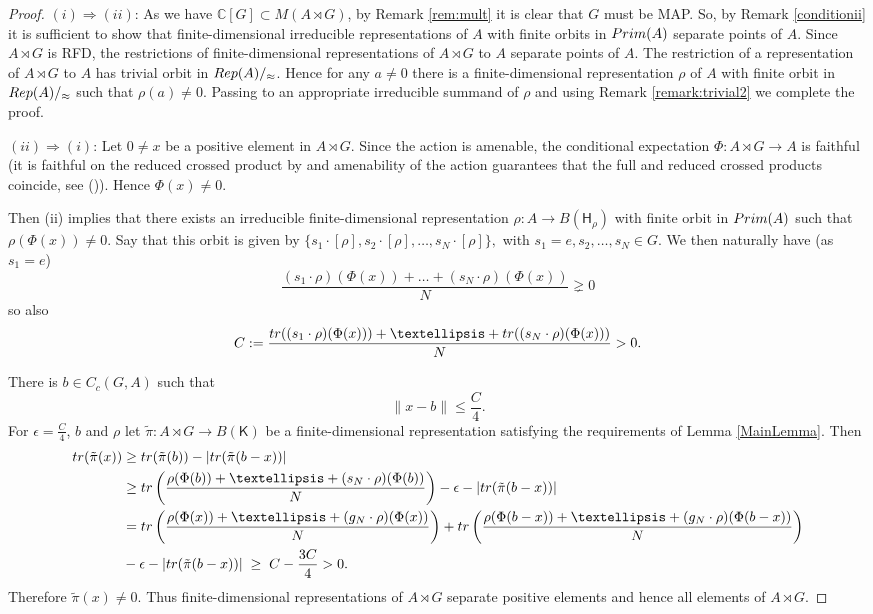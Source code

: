 \documentclass[11 pt, leqno, hidelinks]{amsart}%
\theoremstyle{plain}
\numberwithin{equation}{section}
\newcommand{\C}{\mathbb{C}}
\newcommand{\tr}{\textup{tr}}
\newcommand{\Rep}{\textup{Rep}}
\newcommand{\Prim}{\textup{Prim}}
\newcommand{\Hil}{\mathsf{H}}
\newcommand{\Kil}{\mathsf{K}}
\begin{document}
\begin{proof} $(i)\Rightarrow (ii)$:
		As we have $\C[G] \subset M(A\rtimes G)$, by Remark \ref{rem:mult} it is clear that $G$ must be MAP. So, by Remark \ref{conditionii} it is sufficient to show that finite-dimensional irreducible representations of $A$ with finite orbits in $\Prim(A)$ separate points of $A$. Since $A\rtimes G$ is RFD, the restrictions of finite-dimensional representations of $A\rtimes G$ to $A$ separate points of $A$. The restriction of a representation of $A\rtimes G$ to $A$ has trivial orbit in $\Rep(A)/_\approx$. Hence for any $a\neq 0$ there is a finite-dimensional representation $\rho$ of $A$ with finite orbit in $\Rep(A)/_\approx$ such that $\rho(a)\neq 0$.  Passing to an appropriate irreducible summand of $\rho$ and using Remark \ref{remark:trivial2} we complete the proof.



	
	
	
	\medskip
	


	
	$(ii)\Rightarrow (i)$:
	Let $0\neq x$ be a positive element in $A\rtimes G$. Since the action is amenable, the conditional expectation $\Phi: A\rtimes G \to A$ is faithful (it is faithful on the reduced crossed product by \cite[Proposition 4.1.9]{BO} and amenability of the action guarantees that the full and reduced crossed products coincide, see (\cite[Proposition 4.8]{Claire})). Hence $\Phi(x)\neq 0$. 	

Then (ii) implies that there exists an irreducible  finite-dimensional representation $\rho: A \to B(\Hil_\rho)$ with finite orbit in $\Prim(A)$ such that   $\rho(\Phi(x))\neq 0$.
	 Say that this orbit is given by $\{s_1\cdot [\rho], s_2\cdot[\rho], \ldots, s_N\cdot[\rho]\},$ with $s_1=e, s_2, \ldots, s_N \in G$.  We then naturally have (as $s_1=e$)
	\[ \frac{(s_1 \cdot\rho)(\Phi(x))+\ldots + (s_N \cdot\rho)(\Phi(x))}{N}\gneq 0\]
	so also
	\[ C: = \frac{\tr ((s_1 \cdot\rho)(\Phi(x)))+\ldots + \tr((s_N \cdot\rho)(\Phi(x)))}{N}>0.\]
	
	
	There is $b\in C_c(G, A)$ such that $$\|x-b\|\le \frac{C}{4}.$$ For $\epsilon = \frac{C}{4}$, $b$ and $ \rho$ let  $\tilde\pi: A \rtimes G \to B(\Kil)$ be a finite-dimensional representation satisfying the requirements of Lemma \ref{MainLemma}. Then
	\begin{align*} \tr (\tilde\pi(x))& \ge \tr (\tilde\pi(b)) - |\tr (\tilde\pi(b-x))|
		\\&  \ge \tr \left(\frac{ \rho(\Phi(b))+\ldots + (s_N \cdot\rho)(\Phi(b))}{N} \right)  - \epsilon - |\tr (\tilde\pi(b-x))| \\ &=\tr \left(\frac{ \rho(\Phi(x))+\ldots + (g_N\cdot\rho)(\Phi(x))}{N} \right)  + \tr \left(\frac{ \rho(\Phi(b-x))+\ldots + (g_N\cdot\rho)(\Phi(b-x))}{N} \right) \\ &- \epsilon - |\tr (\tilde\pi(b-x))|\;  \ge \; C - \frac{3C}{4} > 0.
	\end{align*}
	Therefore $\tilde \pi(x) \neq 0$. Thus finite-dimensional representations of $A\rtimes G$ separate positive elements and hence all elements of $A\rtimes G$.
	
\end{proof}
\end{document}
